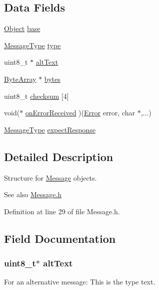 \subsection*{Data Fields}
\begin{DoxyCompactItemize}
\item 
\hyperlink{struct_object}{Object} \hyperlink{struct_message_a23cf4ef56ba22bed625eab08d6361fa7}{base}
\item 
\hyperlink{_constants_8h_ac6606ebe91c8ac66a2c314c79f5ab013}{MessageType} \hyperlink{struct_message_a8a2053c7fb1adf60da2f26c06059539e}{type}
\item 
uint8\_\-t $\ast$ \hyperlink{struct_message_ad4a1b71852a8721ee4be4f6aaacd8566}{altText}
\item 
\hyperlink{struct_byte_array}{ByteArray} $\ast$ \hyperlink{struct_message_affc357b616afe9b58c190ae4b21caa77}{bytes}
\item 
uint8\_\-t \hyperlink{struct_message_a02d93e565ee31bda6e0211dca9b42be5}{checksum} \mbox{[}4\mbox{]}
\item 
void($\ast$ \hyperlink{struct_message_a3c8af4f580f3041d046b7581f89a9695}{onErrorReceived} )(\hyperlink{_constants_8h_a2c3e4bb40f36b262a5214e2da2bca9c5}{Error} error, char $\ast$,...)
\item 
\hyperlink{_constants_8h_ac6606ebe91c8ac66a2c314c79f5ab013}{MessageType} \hyperlink{struct_message_accc3616411ea4a5035a7eaf42132d370}{expectResponse}
\end{DoxyCompactItemize}


\subsection{Detailed Description}
Structure for \hyperlink{struct_message}{Message} objects. 

\begin{DoxySeeAlso}{See also}
\hyperlink{_message_8h}{Message.h} 
\end{DoxySeeAlso}


Definition at line 29 of file Message.h.



\subsection{Field Documentation}
\hypertarget{struct_message_ad4a1b71852a8721ee4be4f6aaacd8566}{
\subsubsection[{altText}]{\setlength{\rightskip}{0pt plus 5cm}uint8\_\-t$\ast$ {\bf altText}}}
\label{struct_message_ad4a1b71852a8721ee4be4f6aaacd8566}
For an alternative message: This is the type text. 

